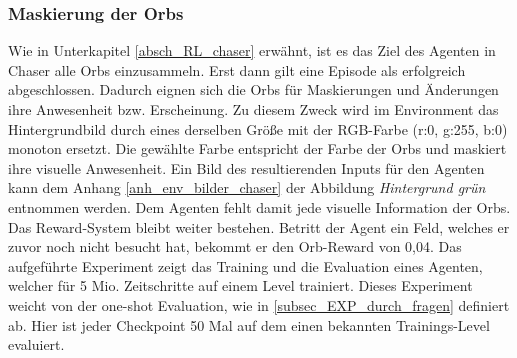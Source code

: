 \subsubsection{Maskierung der Orbs}\label{sub_absch_EXP_durch_serie1_orbsMaskieren}
Wie in Unterkapitel \ref{absch_RL_chaser} erwähnt, ist es das Ziel des Agenten in Chaser alle Orbs einzusammeln. Erst dann gilt eine Episode als erfolgreich abgeschlossen. Dadurch eignen sich die Orbs für Maskierungen und Änderungen ihre Anwesenheit bzw. Erscheinung. Zu diesem Zweck wird im Environment das Hintergrundbild durch eines derselben Größe mit der RGB-Farbe (r:0, g:255, b:0) monoton ersetzt. Die gewählte Farbe entspricht der Farbe der Orbs und maskiert ihre visuelle Anwesenheit. Ein Bild des resultierenden Inputs für den Agenten kann dem Anhang  \ref{anh_env_bilder_chaser} der Abbildung \emph{Hintergrund grün} entnommen werden. Dem Agenten fehlt damit jede visuelle Information der Orbs. Das Reward-System bleibt weiter bestehen. Betritt der Agent ein Feld, welches er zuvor noch nicht besucht hat, bekommt er den Orb-Reward von 0,04. Das aufgeführte Experiment zeigt das Training und die Evaluation eines Agenten, welcher für 5 Mio. Zeitschritte auf einem Level trainiert. Dieses Experiment weicht von der one-shot Evaluation, wie in \ref{subsec_EXP_durch_fragen} definiert ab. Hier ist jeder Checkpoint 50 Mal auf dem einen bekannten Trainings-Level evaluiert.



